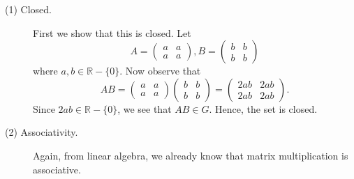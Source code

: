     \begin{description}
        \item[(1) Closed.] First we show that this is closed. Let 
        \[
            A = \begin{pmatrix}
                a & a\\
                a & a
            \end{pmatrix}, 
            B = 
            \begin{pmatrix}
                b & b\\
                b & b
            \end{pmatrix}
        \] 
        where $a, b \in \mathbb{R}-\{0\}$. Now observe that 
        \[
            AB = 
            \begin{pmatrix}
                a & a\\
                a & a
            \end{pmatrix}
            \begin{pmatrix}
                b & b\\
                b & b
            \end{pmatrix}
            = 
            \begin{pmatrix}
                2ab & 2ab\\
                2ab & 2ab
            \end{pmatrix}.
        \]
        Since $2ab \in \mathbb{R}-\{0\}$, we see that $AB \in G$.
        Hence, the set is closed.

        \item[(2) Associativity.] Again, from linear algebra, we
        already know that matrix multiplication is associative.


\end{description}
